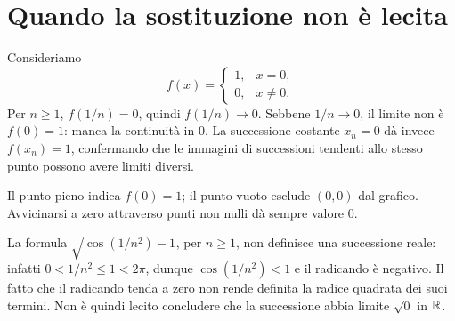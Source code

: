 \section{Quando la sostituzione non è lecita}

\begin{esempio}
Consideriamo
\[
f(x)=\begin{cases}1,&x=0,\\0,&x\ne0.\end{cases}
\]
Per $n\ge1$, $f(1/n)=0$, quindi $f(1/n)\to0$. Sebbene $1/n\to0$, il limite non è $f(0)=1$: manca la continuità in $0$. La successione costante $x_n=0$ dà invece $f(x_n)=1$, confermando che le immagini di successioni tendenti allo stesso punto possono avere limiti diversi.
\end{esempio}

\begin{schema}
\par\smallskip Il punto pieno indica $f(0)=1$; il punto vuoto esclude $(0,0)$ dal grafico. Avvicinarsi a zero attraverso punti non nulli dà sempre valore $0$.
\end{schema}

\begin{esempio}
La formula $\sqrt{\cos(1/n^2)-1}$, per $n\ge1$, non definisce una successione reale: infatti $0<1/n^2\le1<2\pi$, dunque $\cos(1/n^2)<1$ e il radicando è negativo. Il fatto che il radicando tenda a zero non rende definita la radice quadrata dei suoi termini. Non è quindi lecito concludere che la successione abbia limite $\sqrt0$ in $\mathbb{R}$.
\end{esempio}

